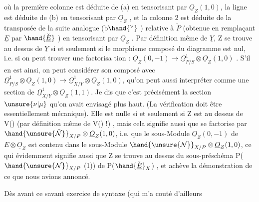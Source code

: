 

où la première colonne est déduite de (a) en tensorisant par $\underline{O}_Z(1,0)$,
la ligne est déduite de  (b) en tensorisant par $\underline{O}_Z$  , et la colonne 2
est déduite  de la transposée de la suite analogue  (b$\hand{^\vee}$ ) relative à $\check{P}$  (obtenue
en remplaçant $\underline{E}$ par $\hand{\check{\underline{E}}}$ )  en tensorisant par $\underline{O}_Z$ . Par définition même
de $\underline{Y}$, Z se trouve au dessus de $\underline{Y}$  si et seulement si le morphisme
composé \hand{$\alpha$} du diagramme est nul, i.e.  si on peut trouver une  factorisa
tion \hand{$\beta$}: $\underline{O}_Z(0,-1) \rightarrow \underline{\Omega}^1_{P/S}\otimes \underline{O}_Z(1,0)$ .  S'il en est ainsi, on  peut
considérer  son composé avec  $\underline{\Omega}^1_{P/S} \otimes \underline{O}_Z(1,0) \rightarrow \underline{\Omega}^1_{X/Y} \otimes \underline{O}_Z(1,0)$,
qu'on peut aussi interpréter comme une section de $\underline{\Omega}^1_{X/Y}\otimes \underline{O}_Z(1,1)$.
Je dis que c'est précisément la section $\unsure{\nu|\mu}$ qu'on avait envisagé plus haut.
(La vérification doit être essentiellement mécanique).  Elle est
nulle  si et seulement si  Z est au dessus de V(\hand{$\unsure{\nu|\mu}$})  (par définition
même de V(\hand{$\unsure{\nu|\mu}$}) !) , mais cela signifie aussi  que \hand{$\beta$} se factorise par
$\hand{\unsure{\check{\mathcal{N}}}}_{X/P} \otimes \underline{O}_Z(1,0)$, i.e. que  le sous-Module $\underline{O}_Z(0,-1)$ de $E\otimes \underline{O}_Z$ est contenu
dans le sous-Module $\hand{\unsure{\mathcal{N}}}_{X/P} \otimes \underline{O}_Z(1,0)$,  ce qui évidemment signifie aussi
que  Z se trouve au dessus du sous-préschéma  P( $\hand{\unsure{\mathcal{N}}}_{X/P}$ (1)) de P($\hand{\check{\underline{E}}}_X$) , et
achève la démonstration de ce que nous avions annoncé.

Dès avant ce savant exercice de syntaxe (qui m'a couté d'ailleurs

